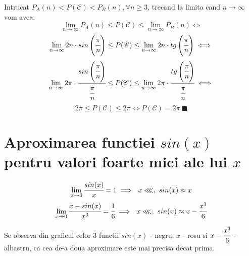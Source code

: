 \documentclass{article}
\newcommand{\handC}{\mathscr{C}}
\begin{document}
        Intrucat $P_A(n) < P(\handC) < P_B(n), \forall n \geq 3$, trecand la limita cand $n\to \infty$ vom avea:\\
        $$\lim_{n\to \infty}P_A(n) \leq P(\handC) \leq \lim_{n\to \infty}P_B(n) \iff$$
        $$\lim_{n\to \infty}2n\cdot sin\left(\cfrac{\pi}{n}\right) \leq P(\handC) \leq \lim_{n\to \infty}2n\cdot tg\left(\cfrac{\pi}{n}\right) \iff$$
        $$\lim_{n\to \infty}2\pi\cdot \cfrac{sin\left(\cfrac{\pi}{n}\right)}{\cfrac{\pi}{n}} \leq P(\handC) \leq \lim_{n\to \infty}2\pi\cdot \cfrac{tg\left(\cfrac{\pi}{n}\right)}{\cfrac{\pi}{n}} \iff$$
        $$2\pi \leq P(\handC) \leq 2\pi \iff P(\handC) = 2\pi\ \blacksquare$$
        
    \section{Aproximarea functiei $sin(x)$ pentru valori foarte mici ale lui $x$}
        $$\lim_{x\to0} \cfrac{sin(x)}{x} = 1 \implies\ x \lll,\ sin(x) \approx x $$
        $$\lim_{x\to0} \cfrac{x-sin(x)}{x^3} = \cfrac{1}{6} \implies\ x \lll,\ sin(x) \approx x-\cfrac{x^3}{6} $$
        \begin{center}
        \end{center}
        
        Se observa din graficul celor 3 functii $sin(x)$ - negru; $x$ - rosu si $x-\cfrac{x^3}{6}$ - albastru, ca cea de-a doua aproximare este mai precisa decat prima.\\
        
\end{document}
